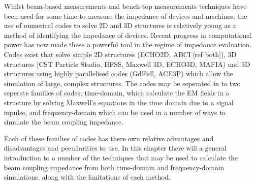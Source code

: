 Whilst beam-based measurements and bench-top measurements techniques have been used for some time to measure the impedance of devices and machines, the use of numerical codes to solve 2D and 3D structures is relatively young as a method of identifying the impedance of devices. Recent progress in computational power has now made these a powerful tool in the regime of impedance evaluation. Codes exist that solve simple 2D structures (ECHO2D, ABCI [ref both]), 3D structures (CST Particle Studio, HFSS, Maxwell 3D, ECHO3D, MAFIA) and 3D structures using highly parallelised codes (GdFidl, ACE3P) which allow the simulation of large, complex structures. The codes may be seperated in to two seperate families of codes; time-domain, which calculate the EM fields in a structure by solving Maxwell's equations in the time domain due to a signal inpulse, and frequency-domain which can be used in a number of ways to simulate the beam coupling impedance.

Each of these families of codes has there own relative advantages and disadvantages and peculiarities to use. In this chapter there will a general introduction to a number of the techniques that may be used to calculate the beam coupling impedance from both time-domain and frequency-domain simulations, along with the limitations of each method.